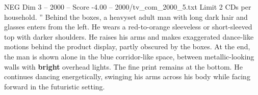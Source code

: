 \begin{textsample}{NEG Dim 3 – 2000 – Score -4.00 – 2000/tv\_com\_2000\_5.txt}
Limit 2 CDs per household. ” Behind the boxes, a heavyset adult man with long dark hair and glasses enters from the left.
He wears a red-to-orange sleeveless or short-sleeved top with darker shoulders.
He raises his arms and makes exaggerated dance-like motions behind the product display, partly obscured by the boxes.
At the end, the man is shown alone in the blue corridor-like space, between metallic-looking walls with \textbf{bright} overhead lights.
The fine print remains at the bottom.
He continues dancing energetically, swinging his arms across his body while facing forward in the futuristic setting.

\end{textsample}
